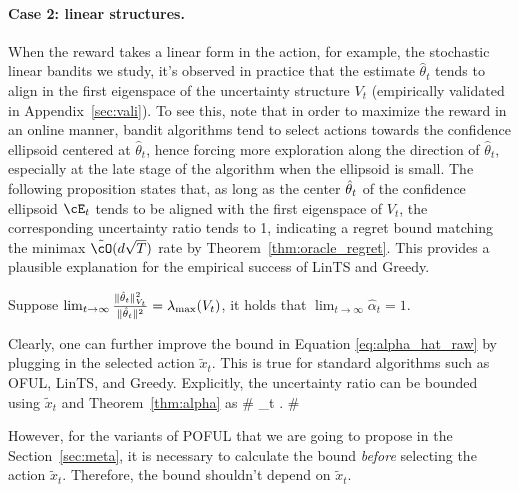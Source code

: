 \paragraph{Case 2:  linear structures.} 
\label{eg:principle_eigen}

When the reward takes a linear form in the action, for example, the stochastic linear bandits we study,  it's observed in practice that the estimate $\hat{\theta}_t$ tends to align in the first eigenspace of the uncertainty structure $V_t$ (empirically validated in Appendix~\ref{sec:vali}). To see this, note that in order to maximize the reward in an online manner, bandit algorithms tend to select actions towards the confidence ellipsoid centered at  $\hat{\theta}_t$, hence forcing more exploration along the direction of $\hat{\theta}_t$, especially at the late stage of the algorithm when the ellipsoid is small. The following proposition states that, as long as the center $\hat{\theta}_t$ of the confidence ellipsoid $\cE_t$  tends to be aligned with the first eigenspace of $V_t$, the corresponding uncertainty ratio tends to 1, indicating a regret bound matching the minimax $\tilde{\cO}(d\sqrt{T})$ rate by Theorem~\ref{thm:oracle_regret}. This provides a plausible explanation for the empirical success of LinTS and Greedy.
\begin{proposition}\label{prop:align}
	 Suppose $\lim_{t\to \infty}\frac{\|\hat{\theta}_t\|_{V_{t}}^2}{\|\hat{\theta}_t\|^2} =\lambda_{\max}(V_{t}) $, it holds that $\lim_{t\to \infty} \hat{\alpha}_t = 1$.	
\end{proposition}


\begin{remark}

Clearly, one can further improve the bound in Equation \eqref{eq:alpha_hat_raw} by plugging in the selected action $\tilde{x}_t$. This is true for standard algorithms such as OFUL, LinTS, and Greedy. Explicitly, the uncertainty ratio can be bounded using $\tilde{x}_t$ and Theorem~\ref{thm:alpha} as 
\#
\alpha_t \leq {}\leq {}.
\#


However, for the variants of POFUL that we are going to propose in the Section~\ref{sec:meta}, it is necessary to calculate the bound \emph{before} selecting the action $\tilde{x}_t$. Therefore, the bound shouldn't depend on $\tilde{x}_t$. 



\end{remark}



